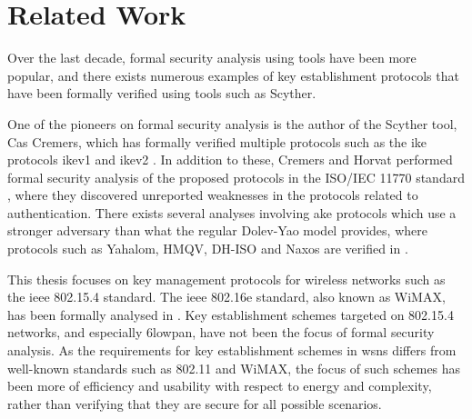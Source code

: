 
\section{Related Work}

Over the last decade, formal security analysis using tools have been more popular, and there exists numerous examples of key establishment protocols that have been formally verified using tools such as Scyther.

One of the pioneers on formal security analysis is the author of the Scyther tool, Cas Cremers, which has formally verified multiple protocols such as the \gls{ike} protocols \gls{ike}v1 and \gls{ike}v2 \cite{Cremers2011}. In addition to these, Cremers and Horvat performed formal security analysis of the proposed protocols in the ISO/IEC 11770 standard \cite{cremers2014improving}, where they discovered unreported weaknesses in the protocols related to authentication. There exists several analyses involving \gls{ake} protocols which use a stronger adversary than what the regular Dolev-Yao model provides, where protocols such as Yahalom, HMQV, DH-ISO and Naxos are verified in \cite{cremers2009comparing}. 


This thesis focuses on key management protocols for wireless networks such as the \gls{ieee} 802.15.4 standard. The \gls{ieee} 802.16e standard, also known as WiMAX, has been formally analysed in \cite{andova2008framework}. Key establishment schemes targeted on 802.15.4 networks, and especially \gls{6lowpan}, have not been the focus of formal security analysis. As the requirements for key establishment schemes in \gls{wsn}s differs from well-known standards such as 802.11 and WiMAX, the focus of such schemes has been more of efficiency and usability with respect to energy and complexity, rather than verifying that they are secure for all possible scenarios.

